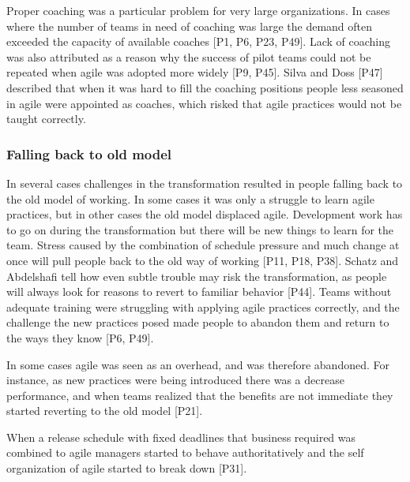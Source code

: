 \documentclass[preprint,authoryear,12pt]{elsarticle}
\begin{document}
Proper coaching was a particular problem for very large organizations. In cases
where the number of teams in need of coaching was large the demand often
exceeded the capacity of available coaches [P1, P6, P23, P49]. Lack of coaching
was also attributed as a reason why the success of pilot teams could not be
repeated when agile was adopted more widely [P9, P45].
Silva and Doss [P47] described that when it was hard to fill the coaching
positions people less seasoned in agile were appointed as coaches, which risked
that agile practices would not be taught correctly.



\subsubsection{Falling back to old model}

In several cases challenges in the transformation resulted in people falling
back to the old model of working.
In some cases it was only a struggle to learn agile practices, but in other
cases the old model displaced agile.
Development work has to go on during the transformation but there will be new
things to learn for the team. Stress caused by the combination of schedule
pressure and much change at once will pull people back to the old way of working
[P11, P18, P38].
Schatz and Abdelshafi tell how even subtle trouble may risk the transformation,
as people will always look for reasons to revert to familiar behavior [P44].
Teams without adequate training were struggling with applying agile practices
correctly, and the challenge the new practices posed made people to abandon them
and return to the ways they know [P6, P49]. 

In some cases agile was seen as an overhead, and was therefore abandoned. For
instance, as new practices were being introduced there was a decrease
performance, and when teams realized that the benefits are not immediate they
started reverting to the old model [P21].

When a release schedule with fixed deadlines that business required was combined
to agile managers started to behave authoritatively and the self organization of
agile started to break down [P31]. %
\end{document}
